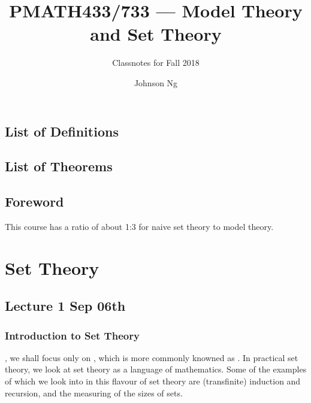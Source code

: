 \documentclass[notoc,notitlepage]{tufte-book}
\title{PMATH433/733 --- Model Theory and Set Theory}
\author{Johnson Ng}
\subtitle{Classnotes for Fall 2018}
\begin{document}
\hypersetup{pageanchor=false}
\maketitle
\hypersetup{pageanchor=true}
\tableofcontents

\chapter*{\faBook \enspace List of Definitions}

\chapter*{\faCoffee \enspace List of Theorems}

\chapter*{Foreword}%
\label{chp:foreword}

This course has a ratio of about 1:3 for naive set theory to model theory.


\part{Set Theory}

\chapter{Lecture 1 Sep 06th}%
\label{chp:lecture_1_sep_06th}

\section{Introduction to Set Theory}%
\label{sec:introduction_to_set_theory}

, we shall focus only on , which is more commonly knowned as . In practical set theory, we look at set theory as a language of mathematics. Some of the examples of which we look into in this flavour of set theory are (transfinite) induction and recursion, and the measuring of the sizes of sets.
\end{document}
